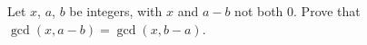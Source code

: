 Let $x$, $a$, $b$ be integers, with $x$ and $a-b$ not both $0$. Prove that $\gcd(x,a-b)=\gcd(x,b-a)$.
